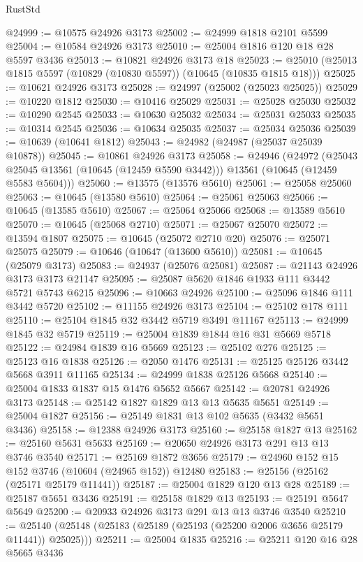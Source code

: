 \begin{lexlean}{RustStd}
\begin{coremodule}
@24999 := @10575 @24926 @3173
@25002 := @24999 @1818 @2101 @5599
@25004 := @10584 @24926 @3173
@25010 := @25004 @1816 @120 @18 @28 @5597 @3436
@25013 := @10821 @24926 @3173 @18
@25023 := @25010 (@25013 @1815 @5597 (@10829 (@10830 @5597)) (@10645 (@10835 @1815 @18)))
@25025 := @10621 @24926 @3173
@25028 := @24997 (@25002 (@25023 @25025))
@25029 := @10220 @1812
@25030 := @10416 @25029
@25031 := @25028 @25030
@25032 := @10290 @2545
@25033 := @10630 @25032
@25034 := @25031 @25033
@25035 := @10314 @2545
@25036 := @10634 @25035
@25037 := @25034 @25036
@25039 := @10639 (@10641 @1812)
@25043 := @24982 (@24987 (@25037 @25039 @10878))
@25045 := @10861 @24926 @3173
@25058 := @24946
    (@24972
      (@25043 @25045 @13561 (@10645 (@12459 @5590 @3442)))
      @13561
      (@10645 (@12459 @5583 @5604)))
@25060 := @13575 (@13576 @5610)
@25061 := @25058 @25060
@25063 := @10645 (@13580 @5610)
@25064 := @25061 @25063
@25066 := @10645 (@13585 @5610)
@25067 := @25064 @25066
@25068 := @13589 @5610
@25070 := @10645 (@25068 @2710)
@25071 := @25067 @25070
@25072 := @13594 @1807
@25075 := @10645 (@25072 @2710 @20)
@25076 := @25071 @25075
@25079 := @10646 (@10647 (@13600 @5610))
@25081 := @10645 (@25079 @3173)
@25083 := @24937 (@25076 @25081)
@25087 := @21143 @24926 @3173 @3173 @21147
@25095 := @25087 @5620 @1846 @1933 @111 @3442 @5721 @5743 @6215
@25096 := @10663 @24926
@25100 := @25096 @1846 @111 @3442 @5720
@25102 := @11155 @24926 @3173
@25104 := @25102 @178 @111
@25110 := @25104 @1845 @32 @3442 @5719 @3491 @11167
@25113 := @24999 @1845 @32 @5719
@25119 := @25004 @1839 @1844 @16 @31 @5669 @5718
@25122 := @24984 @1839 @16 @5669
@25123 := @25102 @276
@25125 := @25123 @16 @1838
@25126 := @2050 @1476
@25131 := @25125 @25126 @3442 @5668 @3911 @11165
@25134 := @24999 @1838 @25126 @5668
@25140 := @25004 @1833 @1837 @15 @1476 @5652 @5667
@25142 := @20781 @24926 @3173
@25148 := @25142 @1827 @1829 @13 @13 @5635 @5651
@25149 := @25004 @1827
@25156 := @25149 @1831 @13 @102 @5635 (@3432 @5651 @3436)
@25158 := @12388 @24926 @3173
@25160 := @25158 @1827 @13
@25162 := @25160 @5631 @5633
@25169 := @20650 @24926 @3173 @291 @13 @13 @3746 @3540
@25171 := @25169 @1872 @3656
@25179 := @24960 @152 @15 @152 @3746 (@10604 (@24965 @152)) @12480
@25183 := @25156 (@25162 (@25171 @25179 @11441))
@25187 := @25004 @1829 @120 @13 @28
@25189 := @25187 @5651 @3436
@25191 := @25158 @1829 @13
@25193 := @25191 @5647 @5649
@25200 := @20933 @24926 @3173 @291 @13 @13 @3746 @3540
@25210 := @25140 (@25148 (@25183 (@25189 (@25193 (@25200 @2006 @3656 @25179 @11441)) @25025)))
@25211 := @25004 @1835
@25216 := @25211 @120 @16 @28 @5665 @3436

\end{coremodule}
\end{lexlean}
